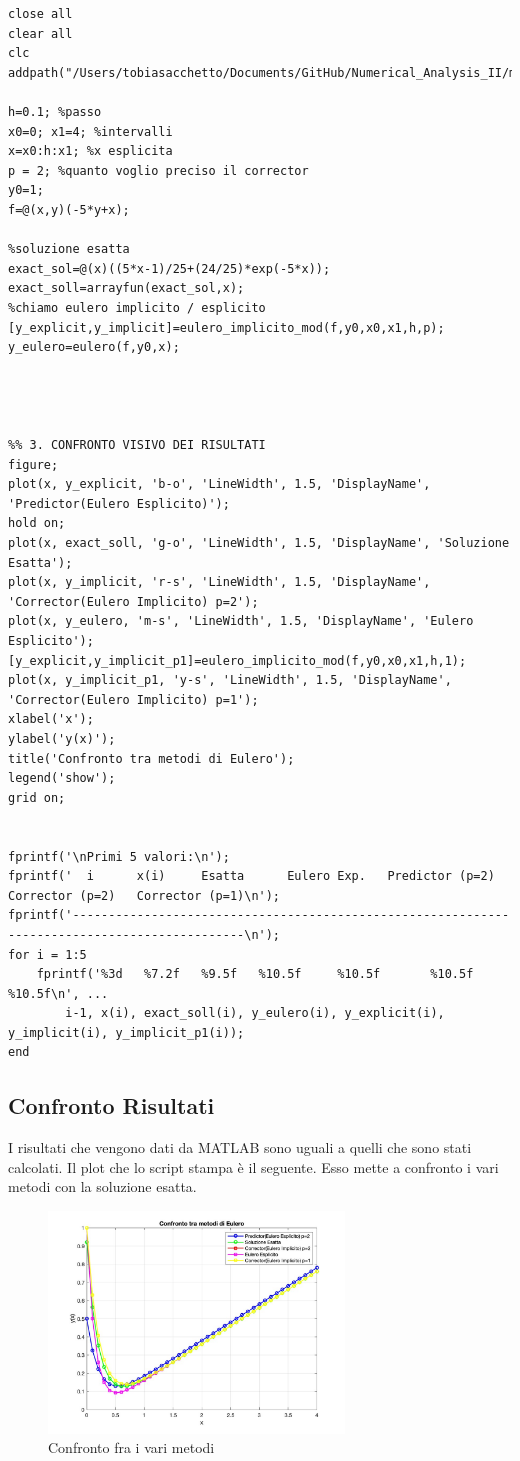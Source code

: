 \documentclass[11pt]{article}
\begin{document}
\begin{lstlisting}
close all
clear all
clc 
addpath("/Users/tobiasacchetto/Documents/GitHub/Numerical_Analysis_II/matlab_class_exercises/Function");

h=0.1; %passo
x0=0; x1=4; %intervalli
x=x0:h:x1; %x esplicita
p = 2; %quanto voglio preciso il corrector
y0=1;
f=@(x,y)(-5*y+x);

%soluzione esatta
exact_sol=@(x)((5*x-1)/25+(24/25)*exp(-5*x));
exact_soll=arrayfun(exact_sol,x);
%chiamo eulero implicito / esplicito
[y_explicit,y_implicit]=eulero_implicito_mod(f,y0,x0,x1,h,p);
y_eulero=eulero(f,y0,x);




%% 3. CONFRONTO VISIVO DEI RISULTATI
figure;
plot(x, y_explicit, 'b-o', 'LineWidth', 1.5, 'DisplayName', 'Predictor(Eulero Esplicito)');
hold on;
plot(x, exact_soll, 'g-o', 'LineWidth', 1.5, 'DisplayName', 'Soluzione Esatta');
plot(x, y_implicit, 'r-s', 'LineWidth', 1.5, 'DisplayName', 'Corrector(Eulero Implicito) p=2');
plot(x, y_eulero, 'm-s', 'LineWidth', 1.5, 'DisplayName', 'Eulero Esplicito');
[y_explicit,y_implicit_p1]=eulero_implicito_mod(f,y0,x0,x1,h,1);
plot(x, y_implicit_p1, 'y-s', 'LineWidth', 1.5, 'DisplayName', 'Corrector(Eulero Implicito) p=1');
xlabel('x');
ylabel('y(x)');
title('Confronto tra metodi di Eulero');
legend('show');
grid on;


fprintf('\nPrimi 5 valori:\n');
fprintf('  i      x(i)     Esatta      Eulero Exp.   Predictor (p=2)   Corrector (p=2)   Corrector (p=1)\n');
fprintf('----------------------------------------------------------------------------------------------\n');
for i = 1:5
    fprintf('%3d   %7.2f   %9.5f   %10.5f     %10.5f       %10.5f       %10.5f\n', ...
        i-1, x(i), exact_soll(i), y_eulero(i), y_explicit(i), y_implicit(i), y_implicit_p1(i));
end
\end{lstlisting}
\subsection{Confronto Risultati}
I risultati che vengono dati da MATLAB sono uguali a quelli che sono stati calcolati. Il plot che lo script stampa è il seguente. Esso mette a confronto i vari metodi con la soluzione esatta.
\begin{figure}[H]
  \centering
  \includegraphics[width=0.7\textwidth]{images/fig1.jpg} 
  \caption{Confronto fra i vari metodi}
  \label{fig:funzione}
\end{figure}
\end{document}
